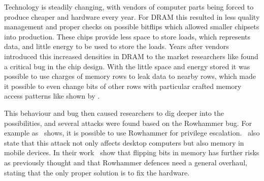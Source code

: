 Technology is steadily changing, with vendors of computer parts being forced to
produce cheaper and hardware every year. For DRAM this resulted in less quality
management and proper checks on possible bitflips which allowed smaller chipsets
into production. These chips provide less space to store loads, which represents
data, and little energy to be used to store the loads. Years after vendors
introduced this increased densities in DRAM to the market researchers like
 found a critical bug in the chip design. With the
little space and energy stored it was possible to use charges of memory rows to
leak data to nearby rows, which made it possible to even change bits of other
rows with particular crafted memory access patterns like shown by
.

This behaviour and bug then caused researchers to dig deeper into the
possibilities, and several attacks were found based on the Rowhammer bug. For
example as~ shows, it is possible to use
Rowhammer for privilege escalation.~ also state that this
attack not only affects desktop computers but also memory in mobile devices. In
their work~ show that flipping bits in memory has
further risks as previously thought and that Rowhammer defences need a general
overhaul, stating that the only proper solution is to fix the hardware.

